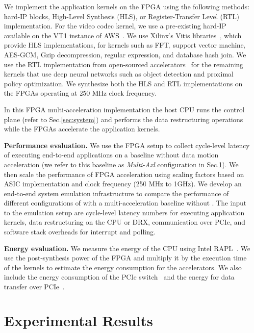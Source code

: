 We implement the application kernels on the FPGA using the following methods: hard-IP blocks, High-Level Synthesis (HLS), or Register-Transfer Level (RTL) implementation. For the video codec kernel, we use a pre-existing hard-IP available on the VT1 instance of AWS~\cite{aws-vt1-instance}. We use Xilinx’s Vitis libraries~\cite{xilinx-vitis-libraries}, which provide HLS implementations, for kernels such as FFT, support vector machine, AES-GCM, Gzip decompression, regular expression, and database hash join. We use the RTL implementation from open-sourced accelerators~\cite{dnnweaver:micro:2016} for the remaining kernels that use deep neural networks such as object detection and proximal policy optimization. We synthesize both the HLS and RTL implementations on the FPGAs operating at 250 MHz clock frequency.

In this FPGA multi-acceleration implementation the host CPU runs the control plane (refer to Sec.\ref{sec:system}) and performs the data restructuring operations while the FPGAs accelerate the application kernels.

\noindent \textbf{Performance evaluation.}
We use the FPGA setup to collect cycle-level latency of executing end-to-end applications on a baseline without data motion acceleration (we refer to this baseline as \textit{Multi-Axl} configuration in Sec.\ref{sec:results}). We then scale the performance of FPGA acceleration using scaling factors based on ASIC implementation and clock frequency (250 MHz to 1GHz).
%
We develop an end-to-end system emulation infrastructure to compare the performance of different configurations of \dmx with a multi-acceleration baseline without \dmx. The input to the emulation setup are cycle-level latency numbers for executing application kernels, data restructuring on the CPU or DRX, communication over PCIe, and software stack overheads for interrupt and polling. 


\noindent \textbf{Energy evaluation.}
We measure the energy of the CPU using Intel RAPL~\cite{intel-rapl}. We use the post-synthesis power of the FPGA and multiply it by the execution time of the kernels to estimate the energy consumption for the accelerators. We also include the energy consumption of the PCIe switch~\cite{broadcom:pcie-switches} and the energy for data transfer over PCIe~\cite{zeppelin:isscc:2018}.


\section{Experimental Results} 
\label{sec:results}

